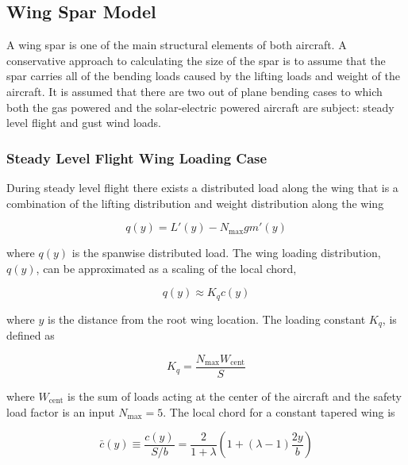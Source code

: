 \documentclass[]{aiaa-tc}%
\begin{document}
\subsection{Wing Spar Model}

A wing spar is one of the main structural elements of both aircraft. 
A conservative approach to calculating the size of the spar is to assume that the spar carries all of the bending loads caused by the lifting loads and weight of the aircraft.  
It is assumed that there are two out of plane bending cases to which both the gas powered and the solar-electric powered aircraft are subject: steady level flight and gust wind loads. 

\subsubsection{Steady Level Flight Wing Loading Case}

During steady level flight there exists a distributed load along the wing that is a combination of the lifting distribution and weight distribution along the wing

\begin{equation}
    \label{e:wloading}
    q(y) = L'(y) - N_{\text{max}}gm'(y)
\end{equation}

where $q(y)$ is the spanwise distributed load. 
The wing loading distribution, $q(y)$, can be approximated as a scaling of the local chord,\cite{bending}

\begin{equation}
    \label{e:wingloading}
    q(y) \approx K_q c(y) 
\end{equation}

where $y$ is the distance from the root wing location. The loading constant $K_q$\cite{bending}, is defined as

\begin{equation}
    \label{e:kq}
    K_q = \frac{N_{\text{max}}W_{\text{cent}}}{S}
\end{equation}

where $W_{\text{cent}}$ is the sum of loads acting at the center of the aircraft and the safety load factor is an input $N_{\text{max}}=5$. The local chord for a constant tapered wing\cite{bending} is 

\begin{equation}
    \label{e:localchord}
    \bar{c}(y) \equiv \frac{c(y)}{S/b} = \frac{2}{1+\lambda} \left( 1 + (\lambda - 1) \frac{2y}{b} \right)
\end{equation}
\end{document}
